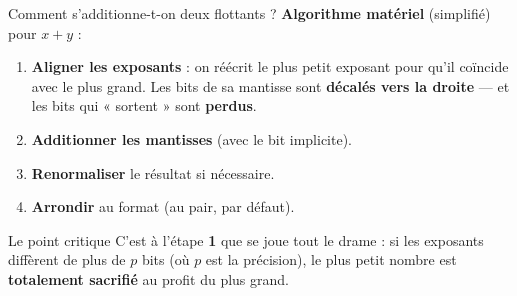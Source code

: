 \begin{frame}{Comment s'additionne-t-on deux flottants ?}
  \textbf{Algorithme matériel} (simplifié) pour $x + y$ :

  \vspace{0.4cm}
  \begin{enumerate}
    \item \textbf{Aligner les exposants} : on réécrit le plus petit
      exposant pour qu'il coïncide avec le plus grand. Les bits de sa
      mantisse sont \textbf{décalés vers la droite} — et les bits qui
      « sortent » sont \textbf{perdus}.
    \item \textbf{Additionner les mantisses} (avec le bit implicite).
    \item \textbf{Renormaliser} le résultat si nécessaire.
    \item \textbf{Arrondir} au format (au pair, par défaut).
  \end{enumerate}

  \vspace{0.4cm}
  \begin{block}{Le point critique}
    C'est à l'étape \textbf{1} que se joue tout le drame :
    si les exposants diffèrent de plus de $p$ bits (où $p$ est la
    précision), le plus petit nombre est \textbf{totalement
    sacrifié} au profit du plus grand.
  \end{block}

\end{frame}

